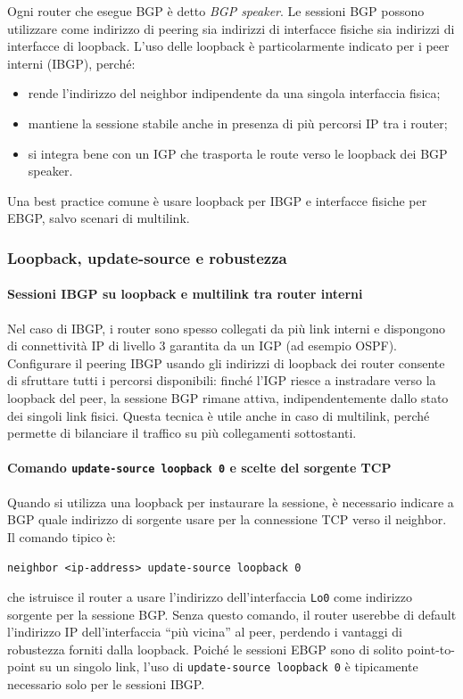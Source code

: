 Ogni router che esegue BGP è detto \emph{BGP speaker}. Le sessioni BGP possono utilizzare come indirizzo di peering sia indirizzi di interfacce fisiche sia indirizzi di interfacce di loopback. L’uso delle loopback è particolarmente indicato per i peer interni (IBGP), perché:
\begin{itemize}
    \item rende l’indirizzo del neighbor indipendente da una singola interfaccia fisica;
    \item mantiene la sessione stabile anche in presenza di più percorsi IP tra i router;
    \item si integra bene con un IGP che trasporta le route verso le loopback dei BGP speaker.
\end{itemize}
Una best practice comune è usare loopback per IBGP e interfacce fisiche per EBGP, salvo scenari di multilink.

\subsubsection{Loopback, update-source e robustezza}

\paragraph{Sessioni IBGP su loopback e multilink tra router interni}

Nel caso di IBGP, i router sono spesso collegati da più link interni e dispongono di connettività IP di livello 3 garantita da un IGP (ad esempio OSPF). Configurare il peering IBGP usando gli indirizzi di loopback dei router consente di sfruttare tutti i percorsi disponibili: finché l’IGP riesce a instradare verso la loopback del peer, la sessione BGP rimane attiva, indipendentemente dallo stato dei singoli link fisici. Questa tecnica è utile anche in caso di multilink, perché permette di bilanciare il traffico su più collegamenti sottostanti.

\paragraph{Comando \texttt{update-source loopback 0} e scelte del sorgente TCP}

Quando si utilizza una loopback per instaurare la sessione, è necessario indicare a BGP quale indirizzo di sorgente usare per la connessione TCP verso il neighbor. Il comando tipico è:
\begin{center}
    \texttt{neighbor <ip-address> update-source loopback 0}
\end{center}
che istruisce il router a usare l’indirizzo dell’interfaccia \texttt{Lo0} come indirizzo sorgente per la sessione BGP. Senza questo comando, il router userebbe di default l’indirizzo IP dell’interfaccia “più vicina” al peer, perdendo i vantaggi di robustezza forniti dalla loopback. Poiché le sessioni EBGP sono di solito point-to-point su un singolo link, l’uso di \texttt{update-source loopback 0} è tipicamente necessario solo per le sessioni IBGP.

